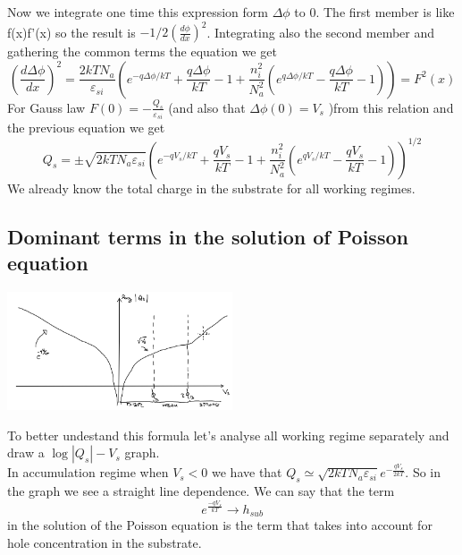 Now we integrate one time this expression form $\Delta \phi$ to 0. The first member is like f(x)f'(x) so the result is $-1/2(\frac{d\phi}{dx})^2$. Integrating also the second member and gathering the common terms the equation we get
\begin{equation}
(\frac{d\Delta \phi }{dx})^2=\frac{2kTN_a}{\varepsilon_{si}}\left(e^{-q\Delta \phi/kT}+\frac{q\Delta \phi}{kT}-1+\frac{n_i^2}{N_a^2}(e^{q\Delta \phi/kT}-\frac{q\Delta \phi}{kT}-1)\right)=F^2(x)
\end{equation}
For Gauss law $F(0)=-\frac{Q_s}{\varepsilon_{si}}$ (and also that $\Delta \phi (0)=V_s$ )from this relation and the previous equation we get
\begin{equation}
Q_s=\pm\sqrt{2kTN_a\varepsilon_{si}}\left(e^{-qV_s/kT}+\frac{qV_s}{kT}-1+\frac{n_i^2}{N_a^2}(e^{qV_s/kT}-\frac{qV_s}{kT}-1)\right)^{1/2}
\end{equation}
We already know the total charge in the substrate for all working regimes.\\
\subsection{Dominant terms in the solution of Poisson equation}
\centering
\includegraphics[width=0.5\textwidth]{logqVs.png}\\
\raggedright

To better undestand this formula let's analyse all working regime separately and draw a $\log |Q_s| - V_s$ graph.\\

\vspace{5mm}
In accumulation regime when $V_s<0$ we have that $Q_s\simeq \sqrt{2kTN_a\varepsilon_{si}}e^{-\frac{qV_s}{2kT}}$. So in the graph we see a straight line dependence. We can say that the term
\begin{equation}
e^{\frac{-qV_s}{kT}}\rightarrow h_{sub}
\end{equation} 
in the solution of the Poisson equation is the term that takes into account for hole concentration in the substrate.\\

